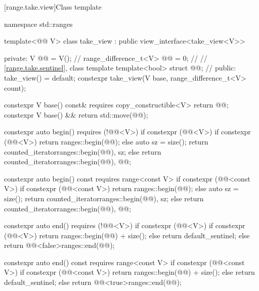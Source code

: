 [range.take.view]{Class template }

%
%
%
%
%
\begin{codeblock}
namespace std::ranges {
  template<@@ V>
  class take_view : public view_interface<take_view<V>> {
  private:
    V @@ = V();                                      // \expos
    range_difference_t<V> @@ = 0;                   // \expos
    // \ref{range.take.sentinel}, class template 
    template<bool> struct @@;                     // \expos
  public:
    take_view() = default;
    constexpr take_view(V base, range_difference_t<V> count);

    constexpr V base() const& requires copy_constructible<V> { return @@; }
    constexpr V base() && { return std::move(@@); }

    constexpr auto begin() requires (!@@<V>) {
      if constexpr (@@<V>) {
        if constexpr (@@<V>)
          return ranges::begin(@@);
        else {
          auto sz = size();
          return counted_iterator{ranges::begin(@@), sz};
        }
      } else
        return counted_iterator{ranges::begin(@@), @@};
    }

    constexpr auto begin() const requires range<const V> {
      if constexpr (@@<const V>) {
        if constexpr (@@<const V>)
          return ranges::begin(@@);
        else {
          auto sz = size();
          return counted_iterator{ranges::begin(@@), sz};
        }
      } else
        return counted_iterator{ranges::begin(@@), @@};
    }

    constexpr auto end() requires (!@@<V>) {
      if constexpr (@@<V>) {
        if constexpr (@@<V>)
          return ranges::begin(@@) + size();
        else
          return default_sentinel;
      } else
        return @@<false>{ranges::end(@@)};
    }

    constexpr auto end() const requires range<const V> {
      if constexpr (@@<const V>) {
        if constexpr (@@<const V>)
          return ranges::begin(@@) + size();
        else
          return default_sentinel;
      } else
        return @@<true>{ranges::end(@@)};
    }

}}
\end{codeblock}
